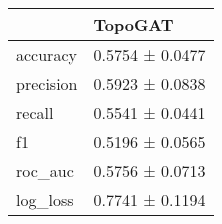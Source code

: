 \begin{tabular}{ll}
\toprule
 & TopoGAT \\
\midrule
accuracy & 0.5754 ± 0.0477 \\
precision & 0.5923 ± 0.0838 \\
recall & 0.5541 ± 0.0441 \\
f1 & 0.5196 ± 0.0565 \\
roc_auc & 0.5756 ± 0.0713 \\
log_loss & 0.7741 ± 0.1194 \\
\bottomrule
\end{tabular}
